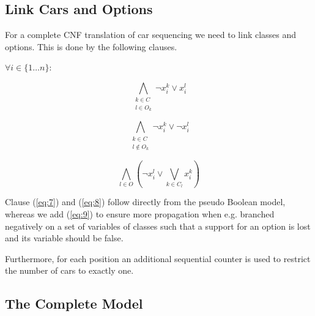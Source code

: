 \documentclass[]{llncs}
\begin{document}
\subsection{Link Cars and Options}

For a complete CNF translation of car sequencing we need to link classes and options. This is done by the following
clauses. 

$\forall i\in \{1\ldots n\}$: 

\begin{equation} \label{eq:7}
     \bigwedge_{\substack{k \in C \\ l \in O_k }} \neg x^k_{i} \vee x^l_{i}
\end{equation}

\begin{equation} \label{eq:8}
    \bigwedge_{\substack{k \in C \\ l \not \in O_k}} \neg x^k_{i} \vee \neg x^l_{i}
\end{equation}

\begin{equation} \label{eq:9}
    \bigwedge_{l\in O} \left(\neg x^l_{i} \vee \bigvee_{k \in C_l} x^k_{i}\right)
\end{equation}

Clause (\ref{eq:7}) and (\ref{eq:8}) follow directly from the pseudo Boolean model, whereas we add (\ref{eq:9}) to
ensure more propagation when e.g. branched negatively on a set of variables of classes such that a support for an
option is lost and its variable should be false.

Furthermore, for each position an additional sequential counter is used to restrict the number of cars to exactly one. 

%

\subsection{The Complete Model}
\end{document}
